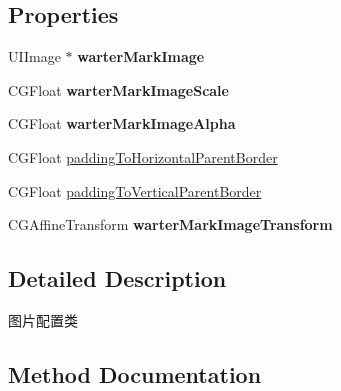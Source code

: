 \subsection*{Properties}
\begin{DoxyCompactItemize}
\item 
\mbox{\label{interface_u_m_social_image_warter_mark_config_a912752aa275adedf4214b9f2c448c8a9}} 
U\+I\+Image $\ast$ {\bfseries warter\+Mark\+Image}
\item 
\mbox{\label{interface_u_m_social_image_warter_mark_config_aafeacf4a0b21a3b10cbef412a9639c76}} 
C\+G\+Float {\bfseries warter\+Mark\+Image\+Scale}
\item 
\mbox{\label{interface_u_m_social_image_warter_mark_config_a7e0bda98a9c4788eb56c12ba3f82be8a}} 
C\+G\+Float {\bfseries warter\+Mark\+Image\+Alpha}
\item 
C\+G\+Float \mbox{\hyperlink{interface_u_m_social_image_warter_mark_config_a493a4569ddb0f7c0d70893a1df8d0291}{padding\+To\+Horizontal\+Parent\+Border}}
\item 
C\+G\+Float \mbox{\hyperlink{interface_u_m_social_image_warter_mark_config_af587deea8e1bf9abeb6c9f8bb6722ec8}{padding\+To\+Vertical\+Parent\+Border}}
\item 
\mbox{\label{interface_u_m_social_image_warter_mark_config_a56a43994c09636d0c7dc68ba49bc931d}} 
C\+G\+Affine\+Transform {\bfseries warter\+Mark\+Image\+Transform}
\end{DoxyCompactItemize}


\subsection{Detailed Description}
图片配置类 

\subsection{Method Documentation}
\mbox{\label{interface_u_m_social_image_warter_mark_config_a3913ff8c1c7b237c41bf641444eb4d8e}} 
